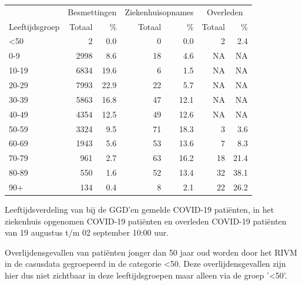 \documentclass[
  english,
  man,floatsintext]{apa6}
\begin{document}
\begin{table}
\centering\begingroup\fontsize{11}{13}\selectfont

\begin{threeparttable}
\begin{tabular}{lrrrrrr}
\toprule
\multicolumn{1}{c}{ } & \multicolumn{2}{c}{Besmettingen} & \multicolumn{2}{c}{Ziekenhuisopnames} & \multicolumn{2}{c}{Overleden} \\
\cmidrule(l{3pt}r{3pt}){2-3} \cmidrule(l{3pt}r{3pt}){4-5} \cmidrule(l{3pt}r{3pt}){6-7}
Leeftijdsgroep & Totaal & \% & Totaal & \% & Totaal & \%\\
\midrule
<50 & 2 & 0.0 & 0 & 0.0 & 2 & 2.4\\
0-9 & 2998 & 8.6 & 18 & 4.6 & NA & NA\\
10-19 & 6834 & 19.6 & 6 & 1.5 & NA & NA\\
20-29 & 7993 & 22.9 & 22 & 5.7 & NA & NA\\
30-39 & 5863 & 16.8 & 47 & 12.1 & NA & NA\\
40-49 & 4354 & 12.5 & 49 & 12.6 & NA & NA\\
50-59 & 3324 & 9.5 & 71 & 18.3 & 3 & 3.6\\
60-69 & 1943 & 5.6 & 53 & 13.6 & 7 & 8.3\\
70-79 & 961 & 2.7 & 63 & 16.2 & 18 & 21.4\\
80-89 & 550 & 1.6 & 52 & 13.4 & 32 & 38.1\\
90+ & 134 & 0.4 & 8 & 2.1 & 22 & 26.2\\
\bottomrule
\end{tabular}
\begin{tablenotes}
\item[1] Leeftijdsverdeling van bij de GGD’en gemelde COVID-19 patiënten, in het ziekenhuis opgenomen COVID-19 patiënten en overleden COVID-19 patiënten van 19 augustus t/m 02 september 10:00 uur.
\item[2] Overlijdensgevallen van patiënten jonger dan 50 jaar oud worden door het RIVM in de casusdata gegroepeerd in de categorie <50. Deze overlijdensgevallen zijn hier dus niet zichtbaar in deze leeftijdsgroepen maar alleen via de groep '<50'.
\end{tablenotes}
\end{threeparttable}
\endgroup{}
\end{table}

\newpage
\end{document}
